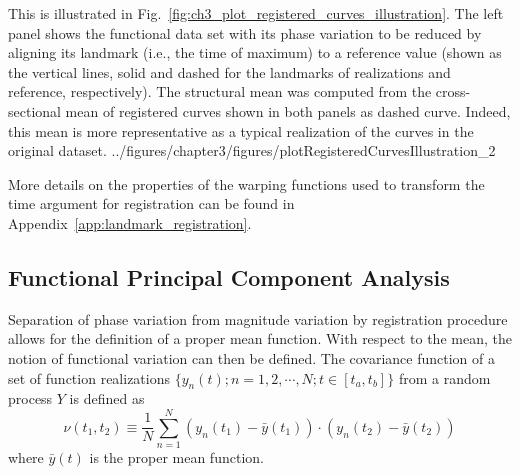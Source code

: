 This is illustrated in Fig.~\ref{fig:ch3_plot_registered_curves_illustration}.
The left panel shows the functional data set with its phase variation to be reduced by aligning its landmark (i.e., the time of maximum) to a reference value 
(shown as the vertical lines, solid and dashed for the landmarks of realizations and reference, respectively).
The structural mean was computed from the cross-sectional mean of registered curves shown in both panels as dashed curve. 
Indeed, this mean is more representative as a typical realization of the curves in the original dataset.
{../figures/chapter3/figures/plotRegisteredCurvesIllustration_2}

More details on the properties of the warping functions used to transform the time argument for registration can be found in Appendix~\ref{app:landmark_registration}.

\subsection{Functional Principal Component Analysis}\label{sub:sa_fpca}

Separation of phase variation from magnitude variation by registration procedure allows for the definition of a proper mean function.
With respect to the mean, the notion of functional variation can then be defined.
The covariance function of a set of function realizations $\{y_n(t);n = 1, 2, \cdots, N; t \in [t_a,t_b]\}$ from a random process $Y$ is defined as
\begin{equation}
	\nu (t_1, t_2) \equiv \frac{1}{N} \sum_{n=1}^{N} (y_n(t_1) - \bar{y}(t_1)) \cdot (y_n(t_2) - \bar{y}(t_2))
\label{eq:covariance_function}
\end{equation}
where $\bar{y} (t)$ is the proper mean function.

